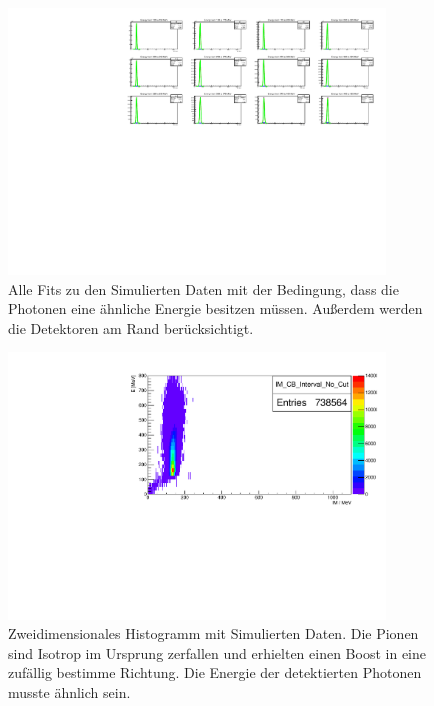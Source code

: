 \documentclass[a4paper,11pt,oneside,final,german,openbib,pdftex]{scrbook}
\begin{document}
{\begin{appendix}
\begin{figure}[h!]
	\begin{center}
		\includegraphics[width=100mm]{NewCalib/20171904Sim30DegreeCutAllFits}
		\caption{Alle Fits zu den Simulierten Daten mit der Bedingung, dass die Photonen eine \"ahnliche Energie besitzen m\"ussen. Au{\ss}erdem werden die Detektoren am Rand ber\"ucksichtigt.}
		\label{fig:Sim-30-Degree-Cut-All-Fits}
	\end{center}
\end{figure}

\begin{figure}[h!]
	\begin{center}
		\includegraphics[width=100mm]{NewCalib/UrsprungIsotrop/20171904SimUrsprungIsotropNoCutHist}
		\caption{Zweidimensionales Histogramm mit Simulierten Daten. Die Pionen sind Isotrop im Ursprung zerfallen und erhielten einen Boost in eine zuf\"allig bestimme Richtung. Die Energie der detektierten Photonen musste \"ahnlich sein.}
		\label{fig:Sim-Data-Ursprung-2DHist-No-Cut}
	\end{center}
\end{figure}


\end{appendix}}
\end{document}

